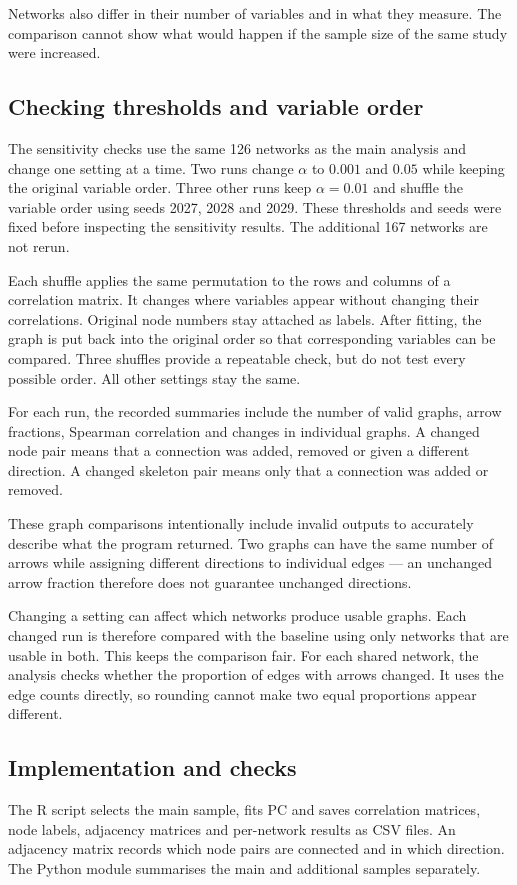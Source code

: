 \documentclass[11pt,a4paper]{article}
\begin{document}
Networks also differ in their number of variables and in what they measure. The comparison cannot show what would happen if the sample size of the same study were increased.

\subsection{Checking thresholds and variable order}
The sensitivity checks use the same 126 networks as the main analysis and change one setting at a time. Two runs change $\alpha$ to $0.001$ and $0.05$ while keeping the original variable order. Three other runs keep $\alpha=0.01$ and shuffle the variable order using seeds 2027, 2028 and 2029. These thresholds and seeds were fixed before inspecting the sensitivity results. The additional 167 networks are not rerun.

Each shuffle applies the same permutation to the rows and columns of a correlation matrix. It changes where variables appear without changing their correlations. Original node numbers stay attached as labels. After fitting, the graph is put back into the original order so that corresponding variables can be compared. Three shuffles provide a repeatable check, but do not test every possible order. All other settings stay the same.

For each run, the recorded summaries include the number of valid graphs, arrow fractions, Spearman correlation and changes in individual graphs. A changed node pair means that a connection was added, removed or given a different direction. A changed skeleton pair means only that a connection was added or removed.

These graph comparisons intentionally include invalid outputs to accurately describe what the program returned. Two graphs can have the same number of arrows while assigning different directions to individual edges — an unchanged arrow fraction therefore does not guarantee unchanged directions.

Changing a setting can affect which networks produce usable graphs. Each changed run is therefore compared with the baseline using only networks that are usable in both. This keeps the comparison fair. For each shared network, the analysis checks whether the proportion of edges with arrows changed. It uses the edge counts directly, so rounding cannot make two equal proportions appear different.

\subsection{Implementation and checks}
The R script  selects the main sample, fits PC and saves correlation matrices, node labels, adjacency matrices and per-network results as CSV files. An adjacency matrix records which node pairs are connected and in which direction. The Python module  summarises the main and additional samples separately.
\end{document}
